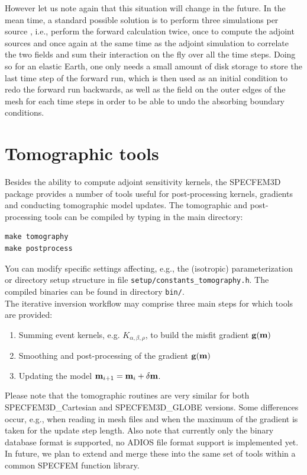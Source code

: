 However let us note again that this situation will change in the future.
In the mean time, a standard possible solution is to perform three simulations per source \cite[]{TrKoLi08,PeKoLuMaLeCaLeMaLiBlNiBaTr11},
i.e., perform the forward calculation twice, once to compute the adjoint sources and once again
at the same time as the adjoint simulation to correlate the two fields and sum their interaction on the fly over all the time steps.
Doing so for an elastic Earth, one only needs a small amount of disk storage to store the last time
step of the forward run, which is then used as an initial condition to redo the forward run backwards,
as well as the field on the outer edges of the mesh for each time steps in order to be able to undo the absorbing boundary conditions.

\section{Tomographic tools}

Besides the ability to compute adjoint sensitivity kernels, the SPECFEM3D package provides a number of tools useful for post-processing kernels, gradients and conducting tomographic model updates. The tomographic and post-processing tools can be compiled by typing in the main directory:
\begin{verbatim}
make tomography
make postprocess
\end{verbatim}
You can modify specific settings affecting, e.g., the (isotropic) parameterization or directory setup structure in file \texttt{setup/constants\_tomography.h}. The compiled binaries can be found in directory \texttt{bin/}.\\

\noindent
The iterative inversion workflow may comprise three main steps for which tools are provided:
\begin{enumerate}
\item Summing event kernels, e.g. $K_{\alpha,\beta,\rho}$, to build the misfit gradient $\mathbf{g}(\mathbf{m})$
\item Smoothing and post-processing of the gradient $\mathbf{g}(\mathbf{m})$
\item Updating the model $\mathbf{m}_{i+1} = \mathbf{m}_i + \delta\mathbf{m}$.
\end{enumerate}

Please note that the tomographic routines are very similar for both SPECFEM3D\_Cartesian and SPECFEM3D\_GLOBE versions. Some differences occur, e.g., when reading in mesh files and when the maximum of the gradient is taken for the update step length. Also note that currently only the binary database format is supported, no ADIOS file format support is implemented yet. In future, we plan to extend and merge these into the same set of tools within a common SPECFEM function library.\\


